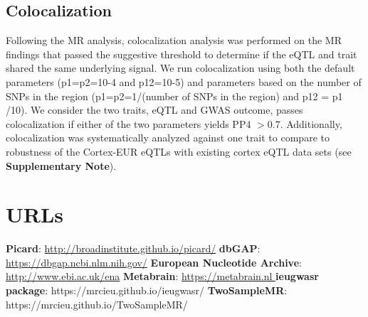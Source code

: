 \subsection{Colocalization}
Following the MR analysis, colocalization analysis was performed on the MR findings that passed the suggestive threshold to determine if the eQTL and trait shared the same underlying signal. We run colocalization using both the default parameters (p1=p2=10-4 and p12=10-5) and parameters based on the number of SNPs in the region (p1=p2=1/(number of SNPs in the region) and p12 = p1 /10). We consider the two traits, eQTL and GWAS outcome, passes colocalization if either of the two parameters yields PP4 $>$0.7. Additionally, colocalization was systematically analyzed against one trait to compare to robustness of the Cortex-EUR eQTLs with existing cortex eQTL data sets (see \textbf{Supplementary Note}). 

\section*{URLs}
\textbf{Picard}: \url{http://broadinstitute.github.io/picard/}
\textbf{dbGAP}: \url{https://dbgap.ncbi.nlm.nih.gov/}
\textbf{European Nucleotide Archive}: \url{http://www.ebi.ac.uk/ena}
\textbf{Metabrain}: \url{https://metabrain.nl }
\textbf{ieugwasr package}: https://mrcieu.github.io/ieugwasr/ 
\textbf{TwoSampleMR}: https://mrcieu.github.io/TwoSampleMR/ 

